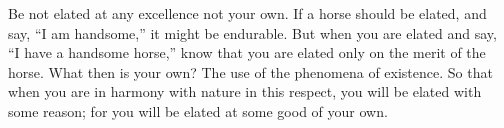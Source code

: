 Be not elated at any excellence not your  own. If a horse should be elated, and
say, ``I am handsome,'' it might be endurable. But when you are elated and say,
``I have a handsome horse,'' know that you  are elated only on the merit of the
horse. What then  is your own? The  use of the phenomena of  existence. So that
when you are  in harmony with nature  in this respect, you will  be elated with
some reason; for you will be elated at some good of your own.
